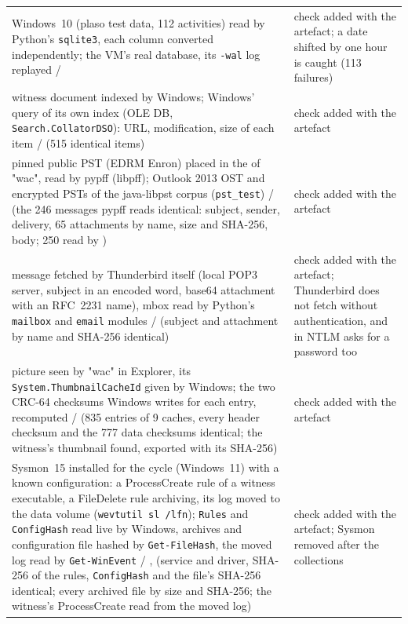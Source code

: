 \documentclass[11pt,a4paper,oneside]{report}
\begin{document}
\begin{longtable}{@{}L{6.6cm}L{8.4cm}@{}}
Windows~10  (plaso test data, 112 activities)
  read by Python's \texttt{sqlite3}, each column converted independently;
  the VM's real database, its \texttt{-wal} log replayed /
   &
  check added with the artefact; a date shifted by one hour is caught
  (113 failures) \\
witness document indexed by Windows; Windows' query of its own index
  (OLE DB, \texttt{Search.CollatorDSO}): URL, modification, size of each
  item /  (515 identical items) &
  check added with the artefact \\
pinned public PST (EDRM Enron) placed in the  of
  "wac", read by pypff (libpff); Outlook 2013 OST and encrypted PSTs of the
  java-libpst corpus (\texttt{pst\_test}) /  (the 246
  messages pypff reads identical: subject, sender, delivery, 65 attachments
  by name, size and SHA-256, body; 250 read by \wac{}) &
  check added with the artefact \\
message fetched by Thunderbird itself (local POP3 server, subject in an
  encoded word, base64 attachment with an RFC~2231 name), mbox read by
  Python's \texttt{mailbox} and \texttt{email} modules / 
  (subject and attachment by name and SHA-256 identical) &
  check added with the artefact; Thunderbird does not fetch without
  authentication, and in NTLM asks for a password too \\
picture seen by "wac" in Explorer, its \texttt{System.ThumbnailCacheId} given
  by Windows; the two CRC-64 checksums Windows writes for each entry,
  recomputed /  (835 entries of 9 caches, every
  header checksum and the 777 data checksums identical; the witness's
  thumbnail found, exported with its SHA-256) &
  check added with the artefact \\
Sysmon~15 installed for the cycle (Windows~11) with a known configuration: a
  ProcessCreate rule of a witness executable, a FileDelete rule archiving, its
  log moved to the data volume (\texttt{wevtutil sl /lfn}); \texttt{Rules} and
  \texttt{ConfigHash} read live by Windows, archives and configuration file
  hashed by \texttt{Get-FileHash}, the moved log read by \texttt{Get-WinEvent}
  / ,  (service and driver, SHA-256
  of the rules, \texttt{ConfigHash} and the file's SHA-256 identical; every archived
  file by size and SHA-256; the witness's ProcessCreate read from the moved
  log) &
  check added with the artefact; Sysmon removed after the collections \\

\end{longtable}
\end{document}
